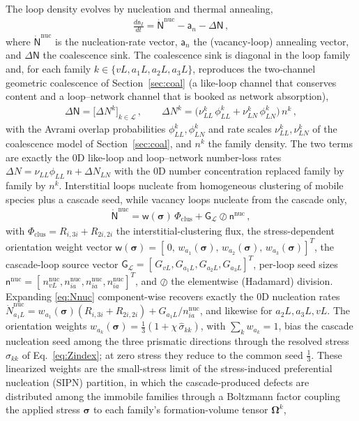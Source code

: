 \documentclass{article}
\newcommand{\spvec}[1]{\bm{\mathsf{#1}}}   %
\begin{document}
The loop density evolves by nucleation and thermal annealing,
\begin{align}\label{eq:cIode}
\frac{d\spvec{n}_I}{dt}=\dot{\spvec{N}}^{\mathrm{nuc}}-\spvec{a}_n-\Delta\spvec{N}\, ,
\end{align}
where $\dot{\spvec{N}}^{\mathrm{nuc}}$ is the nucleation-rate vector, $\spvec{a}_n$ the (vacancy-loop) annealing vector, and $\Delta\spvec{N}$ the coalescence sink. The coalescence sink is diagonal in the loop family and, for each family $k\in\{vL,a_1L,a_2L,a_3L\}$, reproduces the two-channel geometric coalescence of Section~\ref{sec:coal} (a like-loop channel that conserves content and a loop--network channel that is booked as network absorption),
\begin{align}\label{eq:DeltaN}
\Delta\spvec{N}=\bigl[\Delta N^{k}\bigr]_{k\in\mathcal L}\, ,\qquad
\Delta N^{k}=\bigl(\nu_{LL}^{k}\,\phi_{LL}^{k}+\nu_{LN}^{k}\,\phi_{LN}^{k}\bigr)\,n^{k}\, ,
\end{align}
with the Avrami overlap probabilities $\phi_{LL}^{k},\phi_{LN}^{k}$ and rate scales $\nu_{LL}^{k},\nu_{LN}^{k}$ of the coalescence model of Section~\ref{sec:coal}, and $n^{k}$ the family density. The two terms are exactly the $0$D like-loop and loop--network number-loss rates $\Delta N=\nu_{LL}\phi_{LL}\,n+\Delta N_{LN}$ with the $0$D number concentration replaced family by family by $n^{k}$. Interstitial loops nucleate from homogeneous clustering of mobile species plus a cascade seed, while vacancy loops nucleate from the cascade only,
\begin{align}\label{eq:Nnuc}
\dot{\spvec{N}}^{\mathrm{nuc}}=
\spvec{w}(\bm\sigma)\,\Phi_{\mathrm{clus}}+\spvec{G}_{\mathcal{L}}\oslash\spvec{n}^{\mathrm{nuc}}\, ,
\end{align}
with $\Phi_{\mathrm{clus}}=R_{i,3i}+R_{2i,2i}$ the interstitial-clustering flux, the stress-dependent orientation weight vector $\spvec{w}(\bm\sigma)=[\,0,\,w_{a_1}(\bm\sigma),\,w_{a_2}(\bm\sigma),\,w_{a_3}(\bm\sigma)]^T$, the cascade-loop source vector $\spvec{G}_{\mathcal{L}}=[\,G_{vL},G_{a_1L},G_{a_2L},G_{a_3L}]^T$, per-loop seed sizes $\spvec{n}^{\mathrm{nuc}}=[\,n_{vL}^{\mathrm{nuc}},n_{ia}^{\mathrm{nuc}},n_{ia}^{\mathrm{nuc}},n_{ia}^{\mathrm{nuc}}]^T$, and $\oslash$ the elementwise (Hadamard) division. Expanding \eqref{eq:Nnuc} component-wise recovers exactly the $0$D nucleation rates $\dot N_{a_1L}^{\mathrm{nuc}}=w_{a_1}(\bm\sigma)(R_{i,3i}+R_{2i,2i})+G_{a_1L}/n_{ia}^{\mathrm{nuc}}$, and likewise for $a_2L,a_3L,vL$. The orientation weights $w_{a_k}(\bm\sigma)=\tfrac13(1+\chi\,\hat\sigma_{kk})$, with $\sum_k w_{a_k}=1$, bias the cascade nucleation seed among the three prismatic directions through the resolved stress $\sigma_{kk}$ of Eq.~\eqref{eq:Zindex}; at zero stress they reduce to the common seed $\tfrac13$. These linearized weights are the small-stress limit of the stress-induced preferential nucleation (SIPN) partition, in which the cascade-produced defects are distributed among the immobile families through a Boltzmann factor coupling the applied stress $\bm\sigma$ to each family's formation-volume tensor $\bm\Omega^k$,
\end{document}
